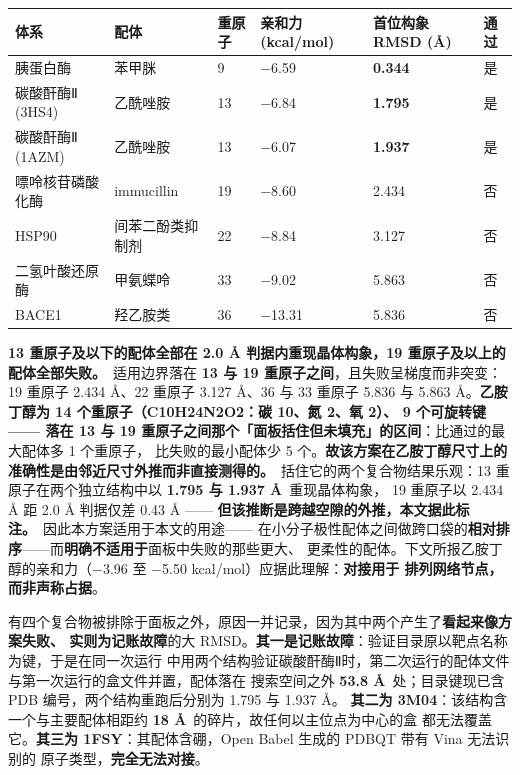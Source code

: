 \documentclass[UTF8,fontset=windows,11pt]{ctexart}
\begin{document}
\begin{center}
\small
\begin{longtable}{p{}p{}p{}p{}p{}p{}}
\hline
体系 & 配体 & 重原子 & 亲和力 (kcal/mol) & 首位构象 RMSD (Å) & 通过 \\
\hline
胰蛋白酶 & 苯甲脒 & 9 & −6.59 & \textbf{0.344} & 是 \\
碳酸酐酶Ⅱ (3HS4) & 乙酰唑胺 & 13 & −6.84 & \textbf{1.795} & 是 \\
碳酸酐酶Ⅱ (1AZM) & 乙酰唑胺 & 13 & −6.07 & \textbf{1.937} & 是 \\
嘌呤核苷磷酸化酶 & immucillin & 19 & −8.60 & 2.434 & 否 \\
HSP90 & 间苯二酚类抑制剂 & 22 & −8.84 & 3.127 & 否 \\
二氢叶酸还原酶 & 甲氨蝶呤 & 33 & −9.02 & 5.863 & 否 \\
BACE1 & 羟乙胺类 & 36 & −13.31 & 5.836 & 否 \\
\hline
\end{longtable}
\end{center}

\textbf{13 重原子及以下的配体全部在 2.0 Å 判据内重现晶体构象，19 重原子及以上的配体全部失败。}\ 适用边界落在 \textbf{13 与 19 重原子之间}，且失败呈梯度而非突变：19 重原子 2.434 Å、22 重原子 3.127 Å、36 与 33 重原子 5.836 与 5.863 Å。\textbf{乙胺丁醇为 14 个重原子（C10H24N2O2：碳 10、氮 2、氧 2）、 9 个可旋转键 —— 落在 13 与 19 重原子之间那个「面板括住但未填充」的区间}：比通过的最大配体多 1 个重原子， 比失败的最小配体少 5 个。\textbf{故该方案在乙胺丁醇尺寸上的准确性是由邻近尺寸外推而非直接测得的。}\ 括住它的两个复合物结果乐观：13 重原子在两个独立结构中以 \textbf{1.795 与 1.937 Å}\ 重现晶体构象， 19 重原子以 2.434 Å 距 2.0 Å 判据仅差 0.43 Å —— \textbf{但该推断是跨越空隙的外推，本文据此标注。}\ 因此本方案适用于本文的用途—— 在小分子极性配体之间做跨口袋的\textbf{相对排序}——而\textbf{明确不适用于}面板中失败的那些更大、 更柔性的配体。下文所报乙胺丁醇的亲和力（−3.96 至 −5.50 kcal/mol）应据此理解：\textbf{对接用于 排列网络节点，而非声称占据}。

有四个复合物被排除于面板之外，原因一并记录，因为其中两个产生了\textbf{看起来像方案失败、 实则为记账故障}的大 RMSD。\textbf{其一是记账故障}：验证目录原以靶点名称为键，于是在同一次运行 中用两个结构验证碳酸酐酶Ⅱ时，第二次运行的配体文件与第一次运行的盒文件并置，配体落在 搜索空间之外 \textbf{53.8 Å}\ 处；目录键现已含 PDB 编号，两个结构重跑后分别为 1.795 与 1.937 Å。 \textbf{其二为 3M04}：该结构含一个与主要配体相距约 \textbf{18 Å}\ 的碎片，故任何以主位点为中心的盒 都无法覆盖它。\textbf{其三为 1FSY}：其配体含硼，Open Babel 生成的 PDBQT 带有 Vina 无法识别的 原子类型，\textbf{完全无法对接}。
\end{document}
